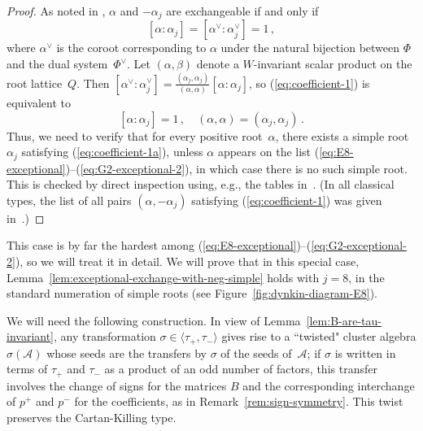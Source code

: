 \documentclass[letterpaper]{amsart}
\numberwithin{equation}{section}
\theoremstyle{definition}
\newcommand{\credit}[1]{\smallskip\noindent {\textbf{#1.\ }}}
\def\AA{\mathcal{A}}
\begin{document}
 
\begin{proof} 
As noted in \cite[Remark~1.16]{cfz}, $\alpha$ and $-\alpha_j$ 
are exchangeable if and only if 
\begin{equation} 
\label{eq:coefficient-1} 
[\alpha : \alpha_j] = [\alpha^\vee : \alpha_j^\vee] = 1 \, , 
\end{equation} 
where $\alpha^\vee$ is the coroot corresponding to $\alpha$ under 
the natural bijection between $\Phi$ and the dual system~$\Phi^\vee$. 
Let $(\alpha,\beta)$ denote a $W$-invariant scalar product on the root 
lattice~$Q$. 
Then $[\alpha^\vee : 
\alpha_j^\vee]=\frac{(\alpha_j,\alpha_j)}{(\alpha,\alpha)} 
[\alpha:\alpha_j]$, 
so (\ref{eq:coefficient-1}) is equivalent to 
\begin{equation} 
\label{eq:coefficient-1a} 
[\alpha : \alpha_j] = 1\,,\quad 
(\alpha,\alpha) = (\alpha_j,\alpha_j) \,. 
\end{equation} 
Thus, we need to verify that for every positive root~$\alpha$, 
there exists a simple root $\alpha_j$ satisfying 
(\ref{eq:coefficient-1a}), unless $\alpha$ appears 
on the list (\ref{eq:E8-exceptional})--(\ref{eq:G2-exceptional-2}), 
in which case there is no such simple root. 
This is checked by direct inspection using, e.g., 
the tables in~\cite{bourbaki}. 
(In all classical types, the list of all pairs $(\alpha, -\alpha_j)$ 
satisfying (\ref{eq:coefficient-1}) was given in~\cite{cfz}.) 
\end{proof} 
 
\pagebreak[2] 
 
\credit{Proof of Lemma~\ref{lem:exceptional-exchange-with-neg-simple} 
for the type~$E_8$ and $\alpha=\alpha_{\rm max}$} 
This case is by far the hardest among 
(\ref{eq:E8-exceptional})--(\ref{eq:G2-exceptional-2}), so we will 
treat it in detail. 
We will prove that in this special case, 
Lemma~\ref{lem:exceptional-exchange-with-neg-simple} 
holds with $j=8$, in the standard numeration of simple roots 
(see Figure~\ref{fig:dynkin-diagram-E8}). 
 
We will need the following construction. 
In view of 
Lemma~\ref{lem:B-are-tau-invariant}, 
any transformation $\sigma\in\langle\tau_+,\tau_-\rangle$ gives rise 
to a ``twisted" cluster algebra $\sigma (\AA)$ whose seeds are the 
transfers by $\sigma$ of the seeds of~$\AA$; 
if $\sigma$ is written in terms of $\tau_+$ and $\tau_-$ as a product of 
an odd number of factors, this transfer involves the change of signs for 
the matrices $B$ and the corresponding interchange of $p^+$ and $p^-$ for 
the coefficients, as in Remark~\ref{rem:sign-symmetry}. 
This twist preserves the Cartan-Killing type. 
 
\end{document}
